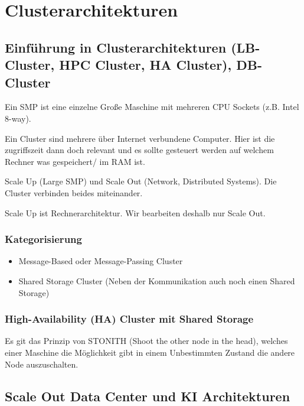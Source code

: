 \documentclass[a4paper]{article}
\title{\docTitle}
\author{Moritz}
\date{\today}
\begin{document}
\maketitle
\tableofcontents


\section{Clusterarchitekturen}

\subsection{Einführung in Clusterarchitekturen (LB-Cluster, HPC Cluster, HA Cluster), DB-Cluster}

Ein SMP ist eine einzelne Große Maschine mit mehreren CPU Sockets (z.B. Intel 8-way).

Ein Cluster sind mehrere über Internet verbundene Computer. Hier ist die zugriffszeit dann doch relevant und es sollte gesteuert werden auf welchem Rechner was gespeichert/ im RAM ist.

Scale Up (Large SMP) und Scale Out (Network, Distributed Systems). Die Cluster verbinden beides miteinander.

Scale Up ist Rechnerarchitektur. Wir bearbeiten deshalb nur Scale Out.

\subsubsection{Kategorisierung}

\begin{itemize}
    \item Message-Based oder Message-Passing Cluster
    \item Shared Storage Cluster (Neben der Kommunikation auch noch einen Shared Storage)
\end{itemize}

\subsubsection{High-Availability (HA) Cluster mit Shared Storage}

Es git das Prinzip von STONITH (Shoot the other node in the head), welches einer Maschine die Möglichkeit gibt in einem Unbestimmten Zustand die andere Node auszuschalten.

\subsection{Scale Out Data Center und KI Architekturen}
\end{document}
